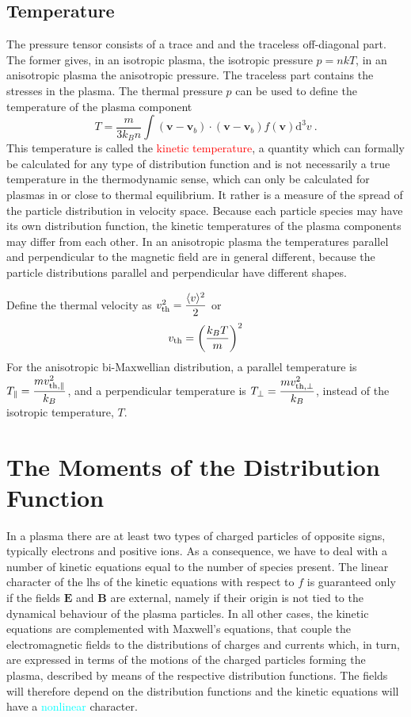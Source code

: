 \documentclass[12pt,a4paper]{article}
\renewcommand{\vec}[1]{\boldsymbol{#1}}
\newcommand{\dif}{\mathrm{d}}
\begin{document}
\subsection{Temperature}
The pressure tensor consists of a trace and and the traceless off-diagonal part. The former gives, in an isotropic plasma, the isotropic pressure $p = nkT$, in an anisotropic plasma the anisotropic pressure. The traceless part contains the stresses in the plasma. The thermal pressure $p$ can be used to define the temperature of the plasma component
\begin{equation}
T = \frac{m}{3k_B n} \int  (\vec{v} -\vec{v}_b)\cdot (\vec{v}-\vec{v}_b) f(\vec{v})  \dif^3 v ~.
\end{equation}
This temperature is called the \textcolor{red}{kinetic temperature}, a quantity which can formally be calculated for any type of distribution function and is not necessarily a true temperature in the thermodynamic sense, which can only be calculated for plasmas in or close to thermal equilibrium. It rather is a measure of the spread of the particle distribution in velocity space. Because each particle species may have its own distribution function, the kinetic temperatures of the plasma components may differ from each other. In an anisotropic plasma the temperatures parallel and perpendicular to the magnetic field are in general different, because the particle distributions parallel and perpendicular have different shapes.

Define the thermal velocity as $v_{\rm th}^2 = \dfrac{\langle v \rangle^2}{2}$ or
\begin{equation}
v_{\rm th} = \left(\dfrac{k_B T}{m} \right)^2
\end{equation}
For the anisotropic bi-Maxwellian distribution, a parallel temperature is $T_\parallel = \dfrac{mv^2_{\rm th, \parallel}}{k_B}$, and a perpendicular temperature is $T_\perp = \dfrac{mv^2_{\rm th, \perp}}{k_B}$, instead of the isotropic temperature, $T$.


\section{The Moments of the Distribution Function}
\cite{2015bps..book.....C} In a plasma there are at least two types of charged particles of opposite signs, typically electrons and positive ions. As a consequence, we have to deal with a number of kinetic equations equal to the number of species present. The linear character of the lhs of the kinetic equations with respect to $f$ is guaranteed only if the fields $\vec{E}$ and $\vec{B}$ are external, namely if their origin is not tied to the dynamical behaviour of the plasma particles. In all other cases, the kinetic equations are complemented with Maxwell’s equations, that couple the electromagnetic fields to the distributions of charges and currents which, in turn, are expressed in terms of the motions of the charged particles forming the plasma, described by means of the respective distribution functions. The fields will therefore depend on the distribution functions and the kinetic equations will have a \textcolor{cyan}{nonlinear} character.
\end{document}
